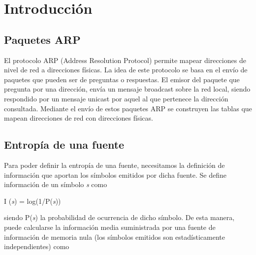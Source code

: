 \documentclass[11pt,a4paper]{article}
\begin{document}

\fecha{\today}


\maketitle
\tableofcontents



\newpage
\section{Introducción}
\paragraph{}

\subsection{Paquetes ARP}
El protocolo ARP (Address Resolution Protocol) permite mapear direcciones de nivel de red a direcciones físicas. La idea de este protocolo se basa en el envío de paquetes que pueden ser de preguntas o respuestas. El emisor del paquete que pregunta por una dirección, envía un mensaje broadcast sobre la red local, siendo respondido por un mensaje unicast por aquel al que pertenece la dirección consultada. Mediante el envío de estos paquetes ARP se construyen las tablas que mapean direcciones de red con direcciones físicas.

\subsection{Entropía de una fuente}
Para poder definir la entropía de una fuente, necesitamos la definición de información que aportan los símbolos emitidos por dicha fuente. Se define información de un símbolo \textit{s} como 
\begin{center}
	I (\textit{s}) = log(1/P(\textit{s})) 
\end{center}
siendo P(\textit{s}) la probabilidad de ocurrencia de dicho símbolo.
De esta manera, puede calcularse la información media suministrada por una fuente de información de memoria nula (los símbolos emitidos son estadísticamente independientes) como 
\end{document}
